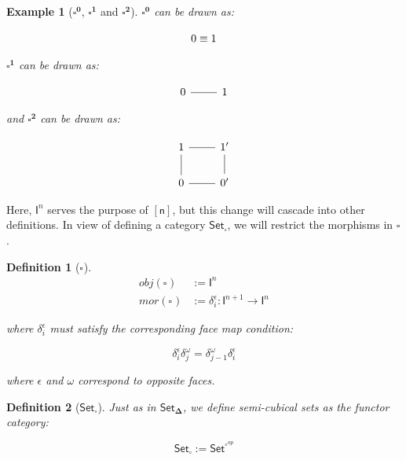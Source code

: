 \documentclass[10pt, titlepage]{amsart}
\newtheorem{definition}{Definition}
\newtheorem{example}{Example}
\newcommand{\Set}{\ensuremath{\mathsf{Set}}}
\newcommand{\SSet}{\ensuremath{\mathsf{Set}_{\boldsymbol{\Delta}}}}
\newcommand{\sq}[1]{\ensuremath{\mathsf{[#1]}}}
\newcommand{\Cube}[1]{\ensuremath{\boldsymbol{\square^{#1}}}}
\newcommand{\I}[1]{\ensuremath{\mathsf{I}^{#1}}}
\newcommand{\CSet}{\ensuremath{\mathsf{Set}_{\boldsymbol{\square}}}}
\begin{document}
\begin{example}[$\Cube{0}$, $\Cube{1}$ and $\Cube{2}$]
  $\Cube{0}$ can be drawn as:

  $$
    \begin{tikzcd}
      0 \equiv 1
    \end{tikzcd}
  $$

  $\Cube{1}$ can be drawn as:

  $$
    \begin{tikzcd}
      0 \arrow[r, dash] & 1
    \end{tikzcd}
  $$

  and $\Cube{2}$ can be drawn as:

  $$
    \begin{tikzcd}
      1 \arrow[r, dash] & 1' \arrow[d, dash] \\
      0 \arrow[u, dash] & 0' \arrow[l, dash]
    \end{tikzcd}
  $$
\end{example}

Here, $\I{n}$ serves the purpose of $\sq{n}$, but this change will cascade into other definitions. In view of defining a category \CSet, we will restrict the morphisms in \Cube{}.

\begin{definition}[\Cube{}]
  \begin{align*}
    obj(\Cube{}) & := \I{n}                                           \\
    mor(\Cube{}) & := \delta^\epsilon_i : \I{n + 1} \rightarrow \I{n}
  \end{align*}

  where $\delta^\epsilon_i$ must satisfy the corresponding face map condition:

  \begin{equation*}
    \delta^\epsilon_i \delta^\omega_j = \delta^\omega_{j - 1} \delta^\epsilon_i
  \end{equation*}

  where $\epsilon$ and $\omega$ correspond to opposite faces.
\end{definition}

\begin{definition}[\CSet]
  Just as in \SSet, we define semi-cubical sets as the functor category:

  \begin{equation*}
    \CSet := \Set^{\Cube{}^{op}}
  \end{equation*}
\end{definition}
\end{document}
